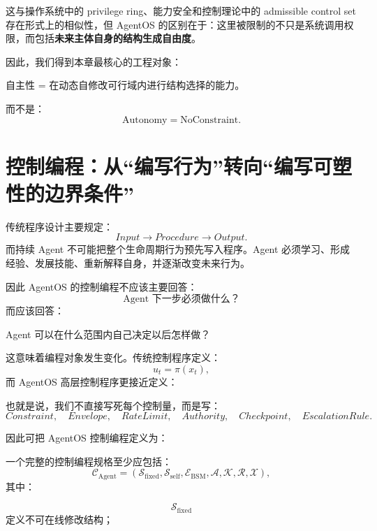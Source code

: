 这与操作系统中的 privilege ring、能力安全和控制理论中的 admissible control set 存在形式上的相似性，但 AgentOS 的区别在于：这里被限制的不只是系统调用权限，而包括\textbf{未来主体自身的结构生成自由度}。

因此，我们得到本章最核心的工程对象：
\begin{statementbox}
自主性 = 在动态自修改可行域内进行结构选择的能力。
\end{statementbox}

而不是：
\[
\text{Autonomy}=\text{NoConstraint}.
\]

\section{控制编程：从“编写行为”转向“编写可塑性的边界条件”}

传统程序设计主要规定：
\[
Input
\rightarrow
Procedure
\rightarrow
Output.
\]
而持续 Agent 不可能把整个生命周期行为预先写入程序。Agent 必须学习、形成经验、发展技能、重新解释自身，并逐渐改变未来行为。

因此 AgentOS 的控制编程不应该主要回答：
\[
\text{Agent 下一步必须做什么？}
\]
而应该回答：
\begin{statementbox}
Agent 可以在什么范围内自己决定以后怎样做？
\end{statementbox}

这意味着编程对象发生变化。传统控制程序定义：
\[
u_t=\pi(x_t),
\]
而 AgentOS 高层控制程序更接近定义：
\begin{statementbox}
\centering
{}
\end{statementbox}

也就是说，我们不直接写死每个控制量，而是写：
\[
Constraint,
\quad
Envelope,
\quad
RateLimit,
\quad
Authority,
\quad
Checkpoint,
\quad
EscalationRule.
\]

因此可把 AgentOS 控制编程定义为：
\begin{statementbox}
\centering
{}
\end{statementbox}

一个完整的控制编程规格至少应包括：
\[
\mathcal C_{\mathrm{Agent}}
=
(
\mathcal S_{\mathrm{fixed}},
\mathcal S_{\mathrm{self}},
\mathcal E_{\mathrm{BSM}},
\mathcal A,
\mathcal K,
\mathcal R,
\mathcal X
),
\]
其中：

\[
\mathcal S_{\mathrm{fixed}}
\]
定义不可在线修改结构；

